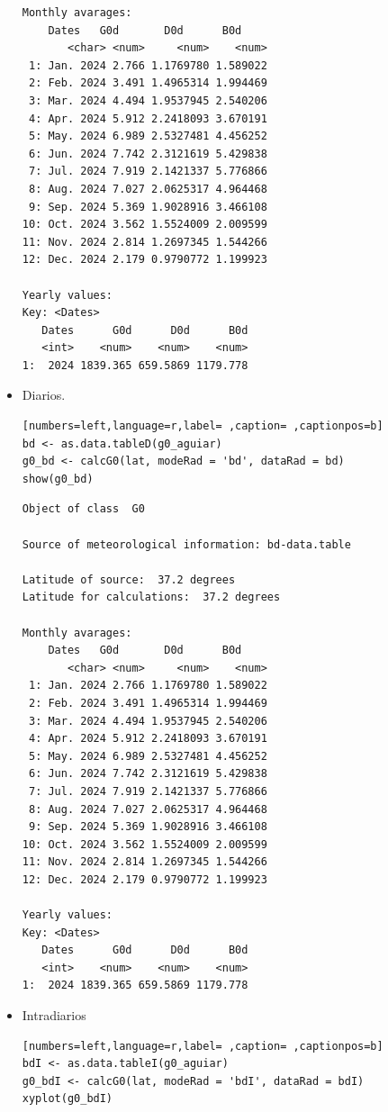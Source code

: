 \begin{itemize}
\begin{verbatim}
Monthly avarages:
	Dates   G0d       D0d      B0d
       <char> <num>     <num>    <num>
 1: Jan. 2024 2.766 1.1769780 1.589022
 2: Feb. 2024 3.491 1.4965314 1.994469
 3: Mar. 2024 4.494 1.9537945 2.540206
 4: Apr. 2024 5.912 2.2418093 3.670191
 5: May. 2024 6.989 2.5327481 4.456252
 6: Jun. 2024 7.742 2.3121619 5.429838
 7: Jul. 2024 7.919 2.1421337 5.776866
 8: Aug. 2024 7.027 2.0625317 4.964468
 9: Sep. 2024 5.369 1.9028916 3.466108
10: Oct. 2024 3.562 1.5524009 2.009599
11: Nov. 2024 2.814 1.2697345 1.544266
12: Dec. 2024 2.179 0.9790772 1.199923

Yearly values:
Key: <Dates>
   Dates      G0d      D0d      B0d
   <int>    <num>    <num>    <num>
1:  2024 1839.365 659.5869 1179.778
\end{verbatim}

\item Diarios.
\begin{lstlisting}[numbers=left,language=r,label= ,caption= ,captionpos=b]
bd <- as.data.tableD(g0_aguiar)
g0_bd <- calcG0(lat, modeRad = 'bd', dataRad = bd)
show(g0_bd)
\end{lstlisting}

\begin{verbatim}
Object of class  G0 

Source of meteorological information: bd-data.table 

Latitude of source:  37.2 degrees
Latitude for calculations:  37.2 degrees

Monthly avarages:
	Dates   G0d       D0d      B0d
       <char> <num>     <num>    <num>
 1: Jan. 2024 2.766 1.1769780 1.589022
 2: Feb. 2024 3.491 1.4965314 1.994469
 3: Mar. 2024 4.494 1.9537945 2.540206
 4: Apr. 2024 5.912 2.2418093 3.670191
 5: May. 2024 6.989 2.5327481 4.456252
 6: Jun. 2024 7.742 2.3121619 5.429838
 7: Jul. 2024 7.919 2.1421337 5.776866
 8: Aug. 2024 7.027 2.0625317 4.964468
 9: Sep. 2024 5.369 1.9028916 3.466108
10: Oct. 2024 3.562 1.5524009 2.009599
11: Nov. 2024 2.814 1.2697345 1.544266
12: Dec. 2024 2.179 0.9790772 1.199923

Yearly values:
Key: <Dates>
   Dates      G0d      D0d      B0d
   <int>    <num>    <num>    <num>
1:  2024 1839.365 659.5869 1179.778
\end{verbatim}

\item Intradiarios
\begin{lstlisting}[numbers=left,language=r,label= ,caption= ,captionpos=b]
bdI <- as.data.tableI(g0_aguiar)
g0_bdI <- calcG0(lat, modeRad = 'bdI', dataRad = bdI)
xyplot(g0_bdI)
\end{lstlisting}


\end{itemize}

